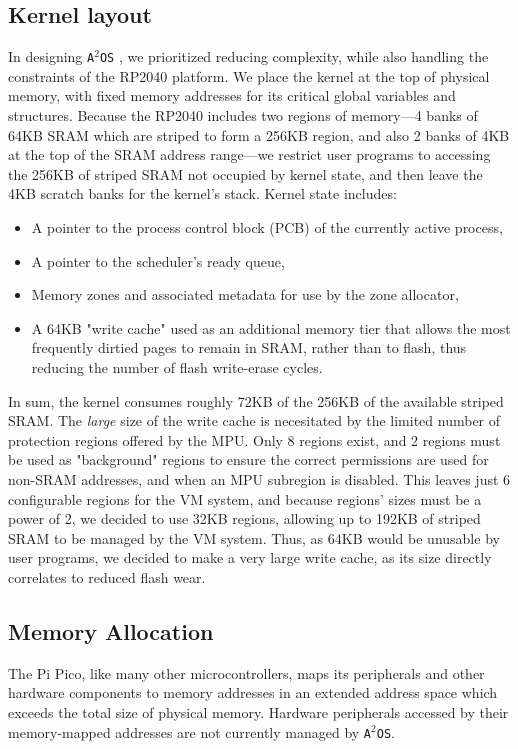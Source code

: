 \documentclass[12pt]{article}
\newcommand{\os}{\texttt{A$^2$OS} }
\newcommand{\osns}{\texttt{A$^2$OS}}
\begin{document}
\subsection{Kernel layout}
In designing \os, we prioritized reducing complexity, while also handling the
constraints of the RP2040 platform. We place the kernel at the top of physical
memory, with fixed memory addresses for its critical global variables and
structures. Because the RP2040 includes two regions of memory---4 banks of 64KB
SRAM which are striped to form a 256KB region, and also 2 banks of 4KB at the
top of the SRAM address range---we restrict user programs to accessing the 256KB
of striped SRAM not occupied by kernel state, and then leave the 4KB scratch
banks for the kernel's stack. Kernel state includes:
\begin{itemize}
    \item {A pointer to the process control block (PCB) of the currently active
    process,}
    \item A pointer to the scheduler's ready queue,
    \item Memory zones and associated metadata for use by the zone allocator,
    \item {A 64KB "write cache" used as an additional memory tier that allows
    the most frequently dirtied pages to remain in SRAM, rather than to flash,
    thus reducing the number of flash write-erase cycles.}
\end{itemize}
In sum, the kernel consumes roughly 72KB of the 256KB of the available striped
SRAM. The \emph{large} size of the write cache is necesitated by the limited
number of protection regions offered by the MPU. Only 8 regions exist, and 2
regions must be used as "background" regions to ensure the correct permissions
are used for non-SRAM addresses, and when an MPU subregion is disabled. This
leaves just 6 configurable regions for the VM system, and because regions' sizes
must be a power of 2, we decided to use 32KB regions, allowing up to 192KB of
striped SRAM to be managed by the VM system. Thus, as 64KB would be unusable by
user programs, we decided to make a very large write cache, as its size directly
correlates to reduced flash wear.

\subsection{Memory Allocation}
The Pi Pico, like many other microcontrollers, maps its peripherals and other
hardware components to memory addresses in an extended address space which
exceeds the total size of physical memory. Hardware peripherals accessed by
their memory-mapped addresses are not currently managed by \osns.
\end{document}
